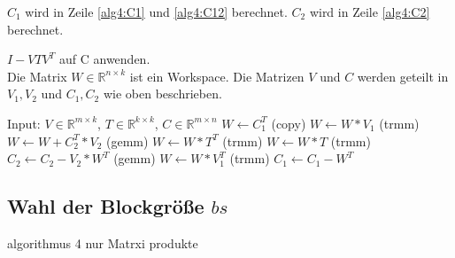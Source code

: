 $C_1$ wird in Zeile \ref{alg4:C1} und \ref{alg4:C12} berechnet. $C_2$ wird in Zeile \ref{alg4:C2} berechnet.



\begin{algorithm}[H]
	\caption{$I - V T V^T$ auf C anwenden.\\
			 Die Matrix $W \in \mathbb{R}^{n \times k}$ ist ein Workspace. Die Matrizen $V$ und $C$ werden geteilt in $V_1, V_2$ und $C_1,C_2$ wie oben beschrieben.}
	\label{alg:applyblockref}
	\begin{algorithmic}[1]
		\State Input: $V \in \mathbb{R}^{m \times k}$, $T \in \mathbb{R}^{k \times k}$, $C \in \mathbb{R}^{m \times n}$
		\State 	$W \leftarrow C_1^T$ (copy) \label{alg4:beg}
		\State	$W \leftarrow W * V_1 $ (trmm)
			\State $W \leftarrow W + C_2^T*V_2$ (gemm)
		\EndIf \label{alg4:end}
		 \label{alg4:trans}
			\State 	$ W \leftarrow W * T^T$ (trmm)
		\Else
			\State 	$  W \leftarrow W * T$ (trmm)
		\EndIf \label{alg4:transE}
			\State $C_2 \leftarrow C_2 - V_2 * W^T$ (gemm) \label{alg4:C2}
		\EndIf
		\State 	$ W \leftarrow W * V_1^T $ (trmm) \label{alg4:C1}
		\State 	$ C_1 \leftarrow C_1 - W^T $ \label{alg4:C12}
	\end{algorithmic}
\end{algorithm}



\subsection{Wahl der Blockgröße $bs$} \label{bs}

algorithmus 4 nur Matrxi produkte


